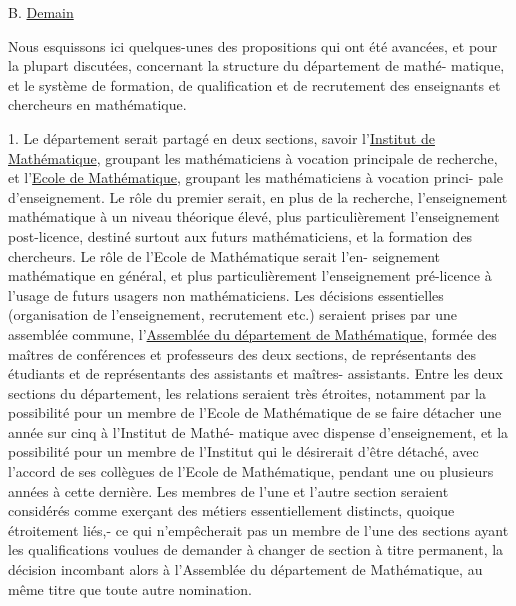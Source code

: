 
B. \uline{Demain}

Nous esquissons ici quelques-unes des propositions qui ont été avancées, et
pour la plupart discutées, concernant la structure du département de mathé-%
matique, et le système de formation, de qualification et de recrutement des
enseignants et chercheurs en mathématique.

1. Le département serait partagé en deux sections, savoir l'\uline{Institut de
Mathématique}, groupant les mathématiciens à vocation principale de recherche,
et l'\uline{Ecole de Mathématique}, groupant les mathématiciens à vocation princi-%
pale d'enseignement. Le rôle du premier serait, en plus de la recherche,
l'enseignement mathématique à un niveau théorique élevé, plus particulièrement
l'enseignement post-licence, destiné surtout aux futurs mathématiciens, et
la formation des chercheurs. Le rôle de l'Ecole de Mathématique serait l'en-%
seignement mathématique en général, et plus particulièrement l'enseignement
pré-licence à l'usage de futurs usagers non mathématiciens. Les décisions
essentielles (organisation de l'enseignement, recrutement etc.) seraient
prises par une assemblée commune, l'\uline{Assemblée du département de Mathématique},
formée des maîtres de conférences et professeurs des deux sections, de
représentants des étudiants et de représentants des assistants et maîtres-%
assistants. Entre les deux sections du département, les relations seraient
très étroites, notamment par la possibilité pour un membre de l'Ecole de
Mathématique de se faire détacher une année sur cinq à l'Institut de Mathé-%
matique avec dispense d'enseignement, et la possibilité pour un membre de
l'Institut qui le désirerait d'être détaché, avec l'accord de ses collègues
de l'Ecole de Mathématique, pendant une ou plusieurs années à cette dernière.
Les membres de l'une et l'autre section seraient considérés comme exerçant
des métiers essentiellement distincts, quoique étroitement liés,- ce qui
n'empêcherait pas un membre de l'une des sections ayant les qualifications
voulues de demander à changer de section à titre permanent, la décision
incombant alors à l'Assemblée du département de Mathématique, au même titre
que toute autre nomination.

